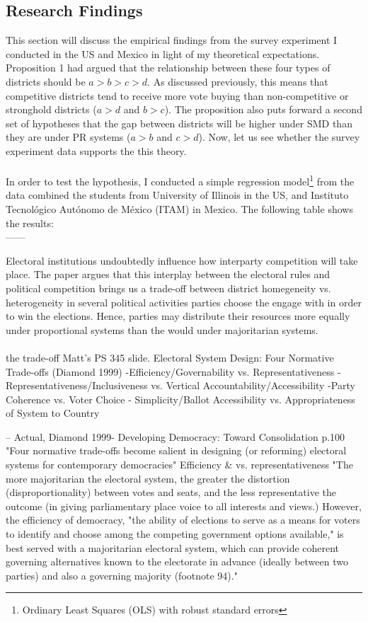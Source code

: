 \documentclass{article}
\begin{document}
\subsection{Research Findings}
This section will discuss the empirical findings from the survey experiment I conducted in the US and Mexico in light of my theoretical expectations. Proposition 1 had argued that the relationship between these four types of districts should be $a>b>c>d$. As discussed previously, this means that competitive districts tend to receive more vote buying than non-competitive or stronghold districts ($a>d$ and $b>c$). The proposition also puts forward a second set of hypotheses that the gap between districts will be higher under SMD than they are under PR systems ($a>b$ and $c>d$). Now, let us see whether the survey experiment data supports the this theory.\\
\\
In order to test the hypothesis, I conducted a simple regression model\footnote{Ordinary Least Squares (OLS) with robust standard errors} from the data combined the students from University of Illinois in the US, and Instituto Tecnol\'{o}gico Aut\'{o}nomo de M\'{e}xico (ITAM) in Mexico. The following table shows the results: \\

------





Electoral institutions undoubtedly influence how interparty competition will take place. The paper argues that this interplay between the electoral rules and political competition brings us a trade-off between district homegeneity vs. heterogeneity in several political activities parties choose the engage with in order to win the elections. Hence, parties may distribute their resources more equally under proportional systems than the would under majoritarian systems.\\
\\


\iffalse the trade-off
Matt's PS 345 slide. 
Electoral System Design: Four Normative Trade-offs (Diamond 1999)
-Efficiency/Governability vs. Representativeness
-Representativeness/Inclusiveness vs. Vertical Accountability/Accessibility 
-Party Coherence vs. Voter Choice
- Simplicity/Ballot Accessibility vs. Appropriateness of System to Country

--
Actual, Diamond 1999- Developing Democracy: Toward Consolidation p.100
"Four normative trade-offs become salient in designing (or reforming) electoral systems for contemporary democracies"
Efficiency \&  vs. representativeness
"The more majoritarian the electoral system, the greater the distortion (disproportionality) between votes and seats, and the less representative the outcome (in giving parliamentary place voice to all interests and views.) However, the efficiency of democracy, "the ability of elections to serve as a means for voters to identify and choose among the competing government options available," is best served with a majoritarian electoral system, which can provide coherent governing alternatives known to the electorate in advance (ideally between two parties) and also a governing majority (footnote 94)."
\end{document}

